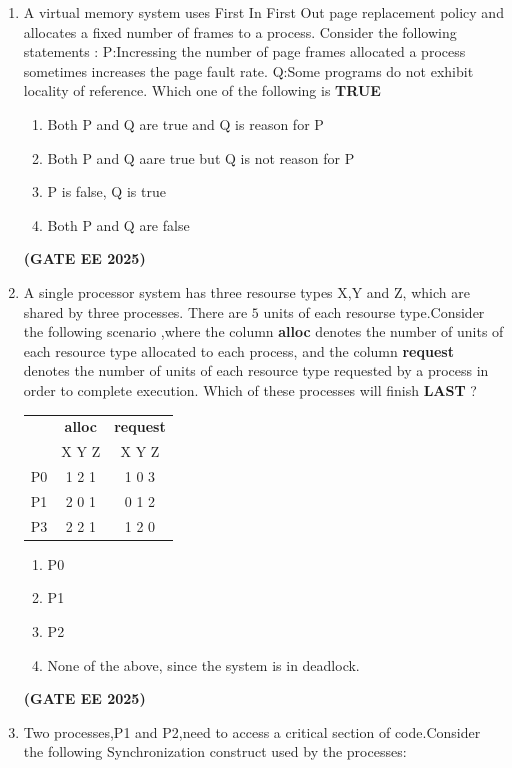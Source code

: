 \documentclass[journal,12pt,onecolumn]{IEEEtran}
\theoremstyle{remark}
\begin{document}
\begin {center}
\begin{enumerate}
\item A virtual memory system uses First In First Out  page replacement policy and allocates a fixed number of frames to a process. Consider the following statements :
\newline 
P:Incressing the number of page frames allocated a  process sometimes increases the page fault rate.
\newline
Q:Some programs do not exhibit locality of reference.
\newline
Which one of the following is \textbf{TRUE}
\begin{enumerate}
    \item Both P and Q are true and Q is reason for  P
    \item Both P and Q aare true but Q is not reason for P
    \item P is false, Q is true 
    \item Both P and Q are false
\end{enumerate}
\hfill \textbf{(GATE EE 2025)}
\item A single processor system has three resourse types X,Y and Z, which are shared by three processes. There are $5$ units of each resourse type.Consider the following scenario ,where the column \textbf{alloc } denotes the number of units of each resource  type allocated to each process, and the column \textbf{request} denotes the number of units of each resource type requested by a process in order to complete execution. Which of these processes will finish  \textbf{LAST} ?
\newline
\begin{tabular}{|c c c| }
\hline
        & \textbf{alloc} & \textbf{request} \\
          & X Y Z & X Y Z \\
       P0 &  1 2 1 & 1 0 3\\
       P1 & 2 0 1 &  0 1 2 \\
       P3 & 2 2 1 & 1 2 0 \\
       \hline
\end{tabular}
\begin{enumerate}
    \item P0
    \item P1
    \item P2
    \item None of the above, since the system is in deadlock.
\end{enumerate}
\hfill \textbf{(GATE EE 2025)}
\item  Two processes,P1 and P2,need to access a critical section of code.Consider the following Synchronization construct used by the processes:
\newline


\end{enumerate}
\end{center}
\end{document}
